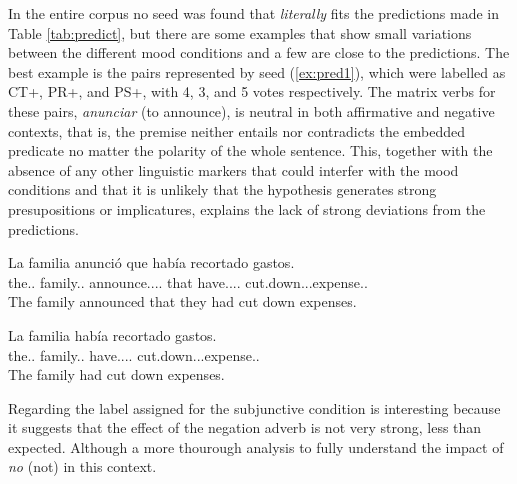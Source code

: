 In the entire corpus no seed was found that \textit{literally} fits the predictions made in Table \ref{tab:predict}, but there are some examples that show small variations between the different mood conditions and a few are close to the predictions. The best example is the pairs represented by seed (\ref{ex:pred1}), which were labelled as CT+, PR+, and PS+, with 4, 3, and 5 votes respectively. The matrix verbs for these pairs, \textit{anunciar} (to announce), is neutral in both affirmative and negative contexts, that is, the premise neither entails nor contradicts the embedded predicate no matter the polarity of the whole sentence. This, together with the absence of any other linguistic markers that could interfer with the mood conditions and that it is unlikely that the hypothesis generates strong presupositions or implicatures, explains the lack of strong deviations from the predictions.\\ 

\begin{exe}
  \ex\label{ex:pred1}
    \begin{xlist}
      \item{\gll La familia anunció que había recortado gastos.\\ the.\F.\Sg{} family.\F.\Sg{} announce.\Pst.\Pfv.\Ind.\Tsg{} that have.\Pst.\Ipfv.\Ind.\Tsg{} cut.down.\Ptcp.\M.\Sg{}expense.\M.\Pl{} \\\glt The family announced that they had cut down expenses.}
      \item{\gll La familia había recortado gastos.\\ the.\F.\Sg{} family.\F.\Sg{} have.\Pst.\Ipfv.\Ind.\Tsg{} cut.down.\Ptcp.\M.\Sg{}expense.\M.\Pl{} \\\glt The family had cut down expenses.} \label{ex:hyppred1}
    \end{xlist}
\end{exe}

Regarding the label assigned for the subjunctive condition is interesting because it suggests that the effect of the negation adverb is not very strong, less than expected. Although a more thourough analysis to fully understand the impact of \textit{no} (not) in this context.\\

